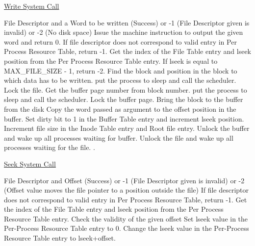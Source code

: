 
\begin{algorithm}
\caption{\href{http://exposnitc.github.io/os_design-files/write.html}{Write System Call}}
\begin{algorithmic}
\REQUIRE File Descriptor and a Word to be written
 (Success) or -1 (File Descriptor given is invalid) or -2 (No disk space)
    \STATE Issue the machine instruction to output the given word and return 0.
\ENDIF
\STATE If file descriptor does not correspond to valid entry in Per Process Resource Table, return -1.
\STATE Get the index of the File Table entry and lseek position from the Per Process Resource Table entry.
\STATE If lseek is equal to MAX\_FILE\_SIZE - 1, return -2.  
\STATE Find the block and position in the block to which data has to be written.
    \STATE put the process to sleep and call the scheduler.
\ENDWHILE
\STATE Lock the file.
\STATE Get the buffer page number from block number.
    \STATE put the process to sleep and call the scheduler.
\ENDWHILE 
\STATE Lock the buffer page.
    \STATE Bring the block to the buffer from the disk
\ENDIF
\STATE Copy the word passed as argument to the offset position in the buffer.  
\STATE Set dirty bit to 1 in the Buffer Table entry and increment lseek position.
\STATE Increment file size in the Inode Table entry and Root file entry.
\STATE Unlock the buffer and wake up all processes waiting for buffer.
\STATE Unlock the file and wake up all processes waiting for the file.
.   
\end{algorithmic}
\end{algorithm}


\begin{algorithm}
\caption{\href{http://exposnitc.github.io/os_design-files/seek.html}{Seek System Call}}
\begin{algorithmic}
\REQUIRE File Descriptor and Offset
 (Success) or -1 (File Descriptor given is invalid) or -2 (Offset value moves the file pointer to a position outside the file)
\STATE If file descriptor does not correspond to valid entry in Per Process Resource Table, return -1.
\STATE Get the index of the File Table entry and lseek position from the Per Process Resource Table entry.
\STATE Check the validity of the given offset
    \STATE Set lseek value in the Per-Process Resource Table entry to 0.
\ELSE
    \STATE Change the lseek value in the Per-Process Resource Table entry to lseek+offset.
\ENDIF
{}
\end{algorithmic}
\end{algorithm}

